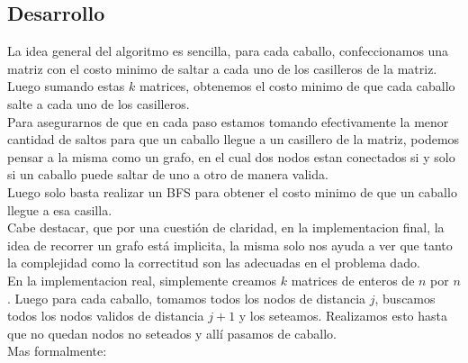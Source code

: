 \subsection{Desarrollo}
La idea general del algoritmo es sencilla, para cada caballo, confeccionamos una matriz con el costo minimo de saltar a cada uno de los casilleros de la matriz. Luego sumando estas $k$ matrices, obtenemos el costo minimo de que cada caballo salte a cada uno de los casilleros.
\\
Para asegurarnos de que en cada paso estamos tomando efectivamente la menor cantidad de saltos para que un caballo llegue a un casillero de la matriz, podemos pensar a la misma como un grafo, en el cual dos nodos estan conectados si y solo si un caballo puede saltar de uno a otro de manera valida.
\\
Luego solo basta realizar un BFS para obtener el costo minimo de que un caballo llegue a esa casilla.
\\
Cabe destacar, que por una cuesti\'on de claridad, en la implementacion final, la idea de recorrer un grafo est\'a implicita, la misma solo nos ayuda a ver que tanto la complejidad como la correctitud son las adecuadas en el problema dado.
\\
En la implementacion real, simplemente creamos $k$ matrices de enteros de $n$ por $n$. Luego para cada caballo, tomamos todos los nodos de distancia $j$, buscamos todos los nodos validos de distancia $j+1$ y los seteamos. Realizamos esto hasta que no quedan nodos no seteados y all\'i pasamos de caballo.
\\
Mas formalmente:

